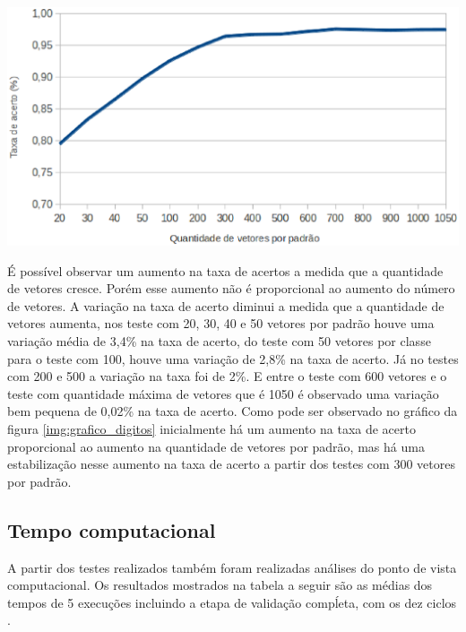 \begin{center}
	\includegraphics[scale=0.5]{graficos/grafico}
	\label{img:grafico_digitos}
\end{center}

É possível observar um aumento na taxa de acertos a medida que a quantidade de vetores cresce. Porém esse aumento não é proporcional ao aumento do número de vetores. A variação na taxa de acerto diminui a medida que a quantidade de vetores aumenta, nos teste com 20, 30, 40 e 50 vetores por padrão houve uma variação média de 3,4\% na taxa de acerto, do teste com 50 vetores por classe para o teste com 100, houve uma variação de 2,8\% na taxa de acerto. Já no testes com 200 e 500 a variação na taxa foi de 2\%. E entre o teste com 600 vetores e o teste com quantidade máxima de vetores que é 1050 é observado uma variação bem pequena de 0,02\% na taxa de acerto.
Como pode ser observado no gráfico da figura \ref{img:grafico_digitos} inicialmente há um aumento na taxa de acerto proporcional ao aumento na quantidade de vetores por padrão, mas há uma estabilização nesse aumento na taxa de acerto a partir dos testes com 300 vetores por padrão.

\subsection{Tempo computacional}
A partir dos testes realizados também foram realizadas análises do ponto de vista computacional.
Os resultados mostrados na tabela a seguir são as médias dos tempos de 5 execuções incluindo a etapa de validação compĺeta, com os dez ciclos .

